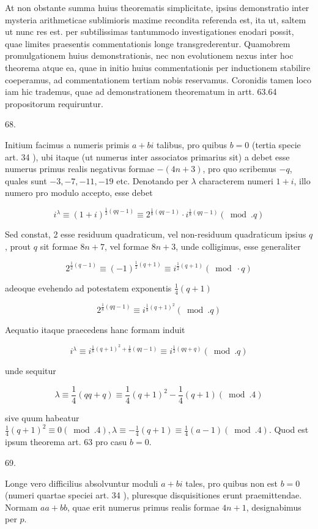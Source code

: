 \documentclass[10pt]{article}
\begin{document}
At non obstante summa huius theorematis simplicitate, ipsius demonstratio inter mysteria arithmeticae sublimioris maxime recondita referenda est, ita ut, saltem ut nunc res est. per subtilissimas tantummodo investigationes enodari possit, quae limites praesentis commentationis longe transgrederentur. Quamobrem promulgationem huius demonstrationis, nec non evolutionem nexus inter hoc theorema atque ea, quae in initio huius commentationis per inductionem stabilire coeperamus, ad commentationem tertiam nobis reservamus. Coronidis tamen loco iam hic trademus, quae ad demonstrationem theorematum in artt. 63.64 propositorum requiruntur.

68.

Initium facimus a numeris primis \(a+b i\) talibus, pro quibus \(b=0\) (tertia specie art. 34 ), ubi itaque (ut numerus inter associatos primarius sit) a debet esse numerus primus realis negativus formae \(-(4 n+3)\), pro quo scribemus \(-q\), quales sunt \(-3,-7,-11,-19\) etc. Denotando per \(\lambda\) characterem numeri \(1+i\), illo numero pro modulo accepto, esse debet

\[
i^{\lambda} \equiv(1+i)^{\frac{1}{2}(q q-1)} \equiv 2^{\frac{1}{8}(q q-1)} \cdot i^{\frac{1}{8}(q q-1)}(\bmod . q)
\]

Sed constat, 2 esse residuum quadraticum, vel non-residuum quadraticum ipsius \(q\), prout \(q\) sit formae \(8 n+7\), vel formae \(8 n+3\), unde colligimus, esse generaliter

\[
2^{\frac{1}{2}(q-1)} \equiv(-1)^{\frac{1}{2}(q+1)} \equiv i^{\frac{1}{2}(q+1)}(\bmod \cdot q)
\]

adeoque evehendo ad potestatem exponentis \(\frac{1}{4}(q+1)\)

\[
2^{\frac{1}{8}(q q-1)} \equiv i^{\frac{1}{8}(q+1)^{2}}(\bmod . q)
\]

Aequatio itaque praecedens hanc formam induit

\[
i^{\lambda} \equiv i^{\frac{1}{8}(q+1)^{2}+\frac{1}{8}(q q-1)} \equiv i^{\frac{1}{2}(q q+q)}(\bmod . q)
\]

unde sequitur

\[
\lambda \equiv \frac{1}{4}(q q+q) \equiv \frac{1}{4}(q+1)^{2}-\frac{1}{4}(q+1)(\bmod .4)
\]

sive quum habeatur \(\frac{1}{4}(q+1)^{2} \equiv 0(\bmod .4), \lambda \equiv-\frac{1}{4}(q+1) \equiv \frac{1}{4}(a-1)(\bmod .4)\). Quod est ipsum theorema art. 63 pro casu \(b=0\).

69.

Longe vero difficilius absolvuntur moduli \(a+b i\) tales, pro quibus non est \(b=0\) (numeri quartae speciei art. 34 ), pluresque disquisitiones erunt praemittendae. Normam \(a a+b b\), quae erit numerus primus realis formae \(4 n+1\), designabimus per \(p\).
\end{document}
